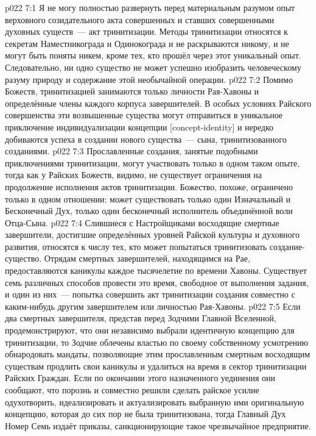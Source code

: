 \vs p022 7:1 Я не могу полностью развернуть перед материальным разумом опыт верховного созидательного акта совершенных и ставших совершенными духовных существ~--- акт тринитизации. Методы тринитизации относятся к секретам Наместникограда и Одинокограда и не раскрываются никому, и не могут быть поняты никем, кроме тех, кто прошёл через этот уникальный опыт. Следовательно, ни одно существо не может успешно изобразить человеческому разуму природу и содержание этой необычайной операции.
\vs p022 7:2 Помимо Божеств, тринитизацией занимаются только личности Рая\hyp{}Хавоны и определённые члены каждого корпуса завершителей. В особых условиях Райского совершенства эти возвышенные существа могут отправиться в уникальное приключение индивидуализации концепции [concept\hyp{}identity] и нередко добиваются успеха в создании нового существа~--- сына, тринитизованного созданиями.
\vs p022 7:3 Прославленные создания, занятые подобными приключениями тринитизации, могут участвовать только в одном таком опыте, тогда как у Райских Божеств, видимо, не существует ограничения на продолжение исполнения актов тринитизации. Божество, похоже, ограничено только в одном отношении: может существовать только один Изначальный и Бесконечный Дух, только один бесконечный исполнитель объединённой воли Отца\hyp{}Сына.
\vs p022 7:4 Слившиеся с Настройщиками восходящие смертные завершители, достигшие определённых уровней Райской культуры и духовного развития, относятся к числу тех, кто может попытаться тринитизовать создание\hyp{}существо. Отрядам смертных завершителей, находящимся на Рае, предоставляются каникулы каждое тысячелетие по времени Хавоны. Существует семь различных способов провести это время, свободное от выполнения задания, и один из них~--- попытка совершить акт тринитизации создания совместно с каким\hyp{}нибудь другим завершителем или личностью Рая\hyp{}Хавоны.
\vs p022 7:5 Если два смертных завершителя, представ перед Зодчими Главной Вселенной, продемонстрируют, что они независимо выбрали идентичную концепцию для тринитизации, то Зодчие облечены властью по своему собственному усмотрению обнародовать мандаты, позволяющие этим прославленным смертным восходящим существам продлить свои каникулы и удалиться на время в сектор тринитизации Райских Граждан. Если по окончании этого назначенного уединения они сообщают, что порознь и совместно решили сделать райское усилие одухотворить, идеализировать и актуализировать выбранную ими оригинальную концепцию, которая до сих пор не была тринитизована, тогда Главный Дух Номер Семь издаёт приказы, санкционирующие такое чрезвычайное предприятие.
